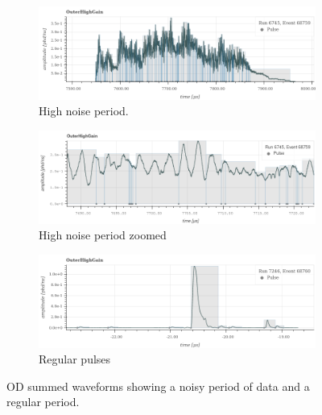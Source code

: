 \begin{figure}[]
\begin{subfigure}{\textwidth}
  \centering
  \includegraphics[width=\linewidth]{Figures/OD_Backgrounds/noise_pulse.png}
  \caption{High noise period.}
  \label{fig:noise_od_waveform}
  \end{subfigure}
  \begin{subfigure}{\textwidth}
  \centering
  \includegraphics[width=\linewidth]{Figures/OD_Backgrounds/noise_pulse_zoomed.png}
  \caption{High noise period zoomed}
  \label{fig:noise_od_waveform_zoomed}
  \end{subfigure}
  \begin{subfigure}{\textwidth}
  \centering
  \includegraphics[width=\linewidth]{Figures/OD_Backgrounds/regular_pulse.png}
  \caption{Regular pulses}
  \label{fig:regular_od_waveform}
  \end{subfigure}
\caption{OD summed waveforms showing a noisy period of data and a regular period.}
\label{fig:od_noise_cut_waveforms}
\end{figure}


